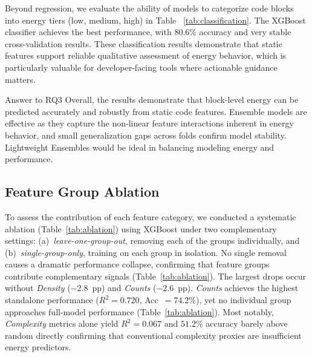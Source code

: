 Beyond regression, we evaluate the ability of models to categorize code blocks into energy tiers (low, medium, high) in Table ~\ref{tab:classification}. The XGBoost classifier achieves the best performance, with 80.6\% accuracy and very stable cross-validation results. These classification results demonstrate that static features support reliable qualitative assessment of energy behavior, which is particularly valuable for developer-facing tools where actionable guidance matters.


\begin{rqbox}{Answer to RQ3}
Overall, the results demonstrate that block-level energy can be predicted accurately and robustly from static code features.  Ensemble models are effective as they capture the non-linear feature interactions inherent in energy behavior, and small
generalization gaps across folds confirm model stability. Lightweight Ensembles would be ideal in balancing modeling energy and performance.
\end{rqbox}


    
\subsection{Feature Group Ablation}
\label{sec:ablation}

% 
To assess the contribution of each feature category, we conducted a
systematic ablation (Table~\ref{tab:ablation}) using XGBoost under two complementary settings:
(a)~\textit{leave-one-group-out}, removing each of the groups
individually, and (b)~\textit{single-group-only}, training on each
group in isolation.
No single removal causes a dramatic performance collapse, confirming
that feature groups contribute complementary signals (Table~\ref{tab:ablation}). The largest drops occur without \textit{Density} ($-$2.8~pp) and \textit{Counts} ($-$2.6~pp).
\textit{Counts} achieves the highest standalone performance ($R^2 =
0.720$, Acc~$= 74.2\%$), yet no individual group approaches full-model
performance (Table~\ref{tab:ablation}). Most notably, \textit{Complexity} metrics alone yield $R^2 = 0.067$ and $51.2\%$ accuracy barely above random directly
confirming that conventional complexity proxies are insufficient energy
predictors.


